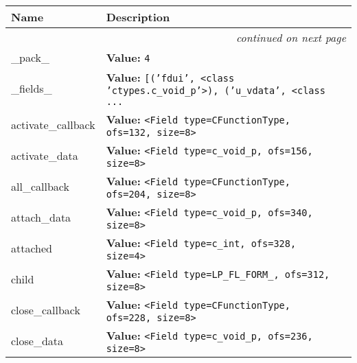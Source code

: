     \vspace{-1cm}
\hspace{\varindent}\begin{longtable}{|p{\varnamewidth}|p{\vardescrwidth}|l}
\cline{1-2}
\cline{1-2} \centering \textbf{Name} & \centering \textbf{Description}& \\
\cline{1-2}
\endhead\cline{1-2}\multicolumn{3}{r}{\small\textit{continued on next page}}\\\endfoot\cline{1-2}
\endlastfoot\raggedright \_\-p\-a\-c\-k\-\_\- & \raggedright \textbf{Value:} 
{\tt 4}&\\
\cline{1-2}
\raggedright \_\-f\-i\-e\-l\-d\-s\-\_\- & \raggedright \textbf{Value:} 
{\tt \texttt{[}\texttt{(}\texttt{'}\texttt{fdui}\texttt{'}\texttt{, }{\textless}class 'ctypes.c\_void\_p'{\textgreater}\texttt{)}\texttt{, }\texttt{(}\texttt{'}\texttt{u\_vdata}\texttt{'}\texttt{, }{\textless}class \texttt{...}}&\\
\cline{1-2}
\raggedright a\-c\-t\-i\-v\-a\-t\-e\-\_\-c\-a\-l\-l\-b\-a\-c\-k\- & \raggedright \textbf{Value:} 
{\tt {\textless}Field type=CFunctionType, ofs=132, size=8{\textgreater}}&\\
\cline{1-2}
\raggedright a\-c\-t\-i\-v\-a\-t\-e\-\_\-d\-a\-t\-a\- & \raggedright \textbf{Value:} 
{\tt {\textless}Field type=c\_void\_p, ofs=156, size=8{\textgreater}}&\\
\cline{1-2}
\raggedright a\-l\-l\-\_\-c\-a\-l\-l\-b\-a\-c\-k\- & \raggedright \textbf{Value:} 
{\tt {\textless}Field type=CFunctionType, ofs=204, size=8{\textgreater}}&\\
\cline{1-2}
\raggedright a\-t\-t\-a\-c\-h\-\_\-d\-a\-t\-a\- & \raggedright \textbf{Value:} 
{\tt {\textless}Field type=c\_void\_p, ofs=340, size=8{\textgreater}}&\\
\cline{1-2}
\raggedright a\-t\-t\-a\-c\-h\-e\-d\- & \raggedright \textbf{Value:} 
{\tt {\textless}Field type=c\_int, ofs=328, size=4{\textgreater}}&\\
\cline{1-2}
\raggedright c\-h\-i\-l\-d\- & \raggedright \textbf{Value:} 
{\tt {\textless}Field type=LP\_FL\_FORM\_, ofs=312, size=8{\textgreater}}&\\
\cline{1-2}
\raggedright c\-l\-o\-s\-e\-\_\-c\-a\-l\-l\-b\-a\-c\-k\- & \raggedright \textbf{Value:} 
{\tt {\textless}Field type=CFunctionType, ofs=228, size=8{\textgreater}}&\\
\cline{1-2}
\raggedright c\-l\-o\-s\-e\-\_\-d\-a\-t\-a\- & \raggedright \textbf{Value:} 
{\tt {\textless}Field type=c\_void\_p, ofs=236, size=8{\textgreater}}&\\

\end{longtable}

